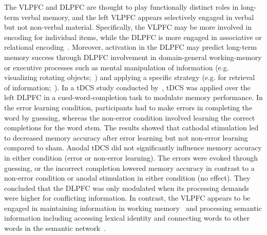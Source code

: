 \documentclass[10pt,letterpaper]{article}
\begin{document}
The VLPFC and DLPFC are thought to play functionally distinct roles in long-term verbal memory, and the left VLPFC appears selectively engaged in  verbal but not non-verbal material. Specifically, the VLPFC may be more involved in encoding for individual items, while the DLPFC is more engaged in associative or relational encoding~\cite{murray2007dorsolateral, blumenfeld2007prefrontal, blumenfeld2011putting, blumenfeld2013lateral}. Moreover, activation in the DLPFC may predict long-term memory success through DLPFC involvement in domain-general working-memory or executive processes such as mental manipulation of information (e.g. visualizing rotating objects;~\cite{blumenfeld2006dorsolateral}) and applying a specific strategy (e.g. for retrieval of information;~\cite{hawco2013dorsolateral}). In a tDCS study conducted by~\cite{hammer2011errorless}, tDCS was applied over the left DLPFC in a cued-word-completion task to modulate memory performance. In the error learning condition, participants had to make errors in completing the word by guessing, whereas the non-error condition involved learning the correct completions for the word stem. The results showed that cathodal stimulation led to decreased memory accuracy after error  learning but not non-error learning compared to sham. Anodal tDCS did not significantly influence memory accuracy in either condition (error or non-error learning). The errors were evoked through guessing, or the incorrect completion lowered memory accuracy in contrast to a non-error condition or anodal stimulation in either condition (no effect). They concluded that the DLPFC was only modulated when its processing demands were higher for conflicting information. In contrast, the VLPFC appears to be engaged in maintaining information in working memory~\cite{takahashi2007diffusion} and processing semantic information including accessing lexical identity and connecting words to other words in the semantic network~\cite{raposo2009ventrolateral}. 
\end{document}
